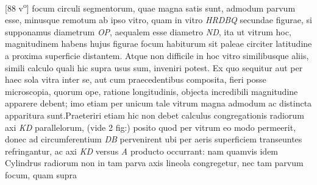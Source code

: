 [88 v\textsuperscript{o}] focum\protect{} circuli segmentorum, quae magna satis sunt, admodum  parvum esse, minusque remotum ab ipso vitro, quam in vitro \textit{HRDBQ} secundae figurae, si supponamus diametrum \textit{OP}, aequalem esse diametro \textit{ND}, ita ut vitrum hoc,  magnitudinem habens hujus figurae focum\protect{} habiturum sit  paleae circiter latitudine a proxima superficie distantem.  Atque non difficile in hoc vitro similibusque aliis, simili calculo  quali hic supra usus sum, inveniri potest. Ex quo sequitur  aut per haec sola vitra inter se, aut cum praecedentibus composita,  fieri posse microscopia\protect{}, quorum ope, ratione longitudinis,  objecta incredibili magnitudine apparere debent; imo  etiam per unicum tale vitrum magna admodum ac  distincta apparitura sunt.\pend \pstart  Praeteriri etiam hic non debet calculus congregationis  radiorum axi \textit{KD} parallelorum, (vide 2 fig:) posito quod  per vitrum eo modo permeerit, donec ad circumferentium \textit{DB} pervenirent ubi per aeris superficiem transeuntes  refringantur, ac axi \textit{KD} versus \textit{A} producto occurrant: nam  quamvis idem Cylindrus radiorum non in tam parva axis  lineola congregetur, nec tam parvum focum\protect{}, quam supra 